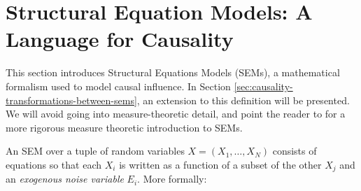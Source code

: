 






\section{Structural Equation Models: A Language for Causality}\label{sec:causality-structural-equation-models}

This section introduces Structural Equations Models (SEMs), a mathematical formalism used to model causal influence. In Section \ref{sec:causality-transformations-between-sems}, an extension to this definition will be presented.
We will avoid going into measure-theoretic detail, and point the reader to \cite{bongers2016structural} for a more rigorous measure theoretic introduction to SEMs.


An SEM over a tuple of random variables $X = (X_1, \ldots, X_N)$ consists of equations so that each $X_i$ is written as a function of a subset of the other $X_j$ and an \emph{exogenous noise variable} $E_i$. More formally:

\medskip

